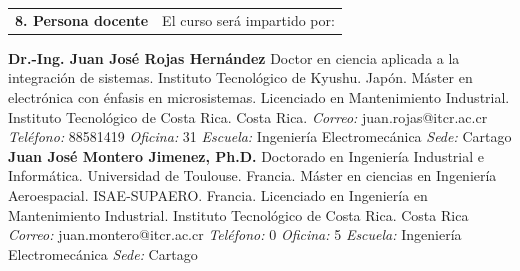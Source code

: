 \documentclass[letterpaper]{article}%
\newenvironment{textoMargen}
    {%
    \begin{list}{}{%
        \setlength{\leftmargin}{3.6cm}%
        \setlength{\rightmargin}{1.1cm}%
    }%
    \item[]%
  }
  {%
    \end{list}%
  }
\begin{document}
\vspace*{-8mm}\printbibliography[heading=none]%
\begin{tabularx}{\textwidth}{p{3cm}p{13cm}}%
\par\fontsize{12}{14}\selectfont \textbf{\textcolor{parte}{8. Persona docente}}&El curso será impartido por:\\%
\end{tabularx}%
\vspace*{-4mm}\begin{textoMargen}\textbf{Dr.{-}Ing. Juan José Rojas Hernández} \vspace*{2mm} \newline Doctor en ciencia aplicada a la integración de sistemas. Instituto Tecnológico de Kyushu. Japón. \newline \newline  Máster en electrónica con énfasis en microsistemas. Licenciado en Mantenimiento Industrial. Instituto Tecnológico de Costa Rica. Costa Rica. \newline \newline \emph{Correo:} juan.rojas@itcr.ac.cr\emph{  Teléfono:} 88581419 \vspace*{1mm} \newline \emph{  Oficina:} 31\emph{  Escuela:} Ingeniería Electromecánica\emph{  Sede:} Cartago \vspace*{4mm} \newline \textbf{Juan José Montero Jimenez, Ph.D.} \vspace*{2mm} \newline Doctorado en Ingeniería Industrial e Informática. Universidad de Toulouse. Francia. \newline \newline  Máster en ciencias en Ingeniería Aeroespacial. ISAE-SUPAERO. Francia. \newline \newline  Licenciado en Ingeniería en Mantenimiento Industrial. Instituto Tecnológico de Costa Rica. Costa Rica \newline \newline \emph{Correo:} juan.montero@itcr.ac.cr\emph{  Teléfono:} 0 \vspace*{1mm} \newline \emph{  Oficina:} 5\emph{  Escuela:} Ingeniería Electromecánica\emph{  Sede:} Cartago \vspace*{4mm} \newline \end{textoMargen}%
\end{document}
